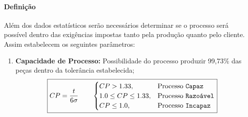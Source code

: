 \documentclass{article}
\begin{document}
            \paragraph{Definição}Além dos dados estatísticos serão necessários determinar se o processo será possível dentro das exigências impostas tanto pela produção quanto pelo cliente. Assim estabelecem os seguintes parâmetros:
                \begin{enumerate}[rightmargin = \leftmargin, noitemsep]
                    \item \textbf{Capacidade de Processo:} Possibilidade do processo produzir 99,73\% das peças dentro da tolerância estabelecida;
                        \begin{equation}
                            \boxed{
                                CP = \frac{t}{6\sigma}
                                \qquad
                                \begin{cases}
                                    CP > 1.33, & \text{Processo \texttt{Capaz}}\\
                                    1.0 \le CP \le 1.33, & \text{Processo \texttt{Razoável}}\\
                                    CP \le 1.0, & \text{Processo \texttt{Incapaz}}\\
                                \end{cases}
                            }
                        \end{equation}


\end{enumerate}
\end{document}
